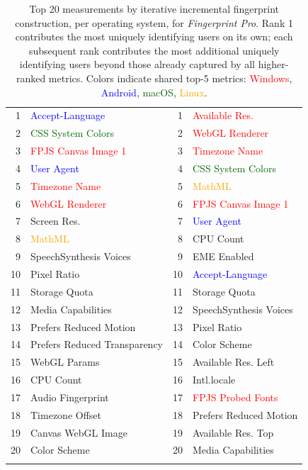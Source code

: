 \begin{table}[H]
\begin{tabular}{r l | r l}
\Xhline{2\arrayrulewidth}
1 & \textcolor{blue}{Accept-Language} & 1 & \textcolor{red}{Available Res.} \\
2 & \textcolor{darkgreen}{CSS System Colors} & 2 & \textcolor{red}{WebGL Renderer} \\
3 & \textcolor{red}{FPJS Canvas Image 1} & 3 & \textcolor{red}{Timezone Name} \\
4 & \textcolor{blue}{User Agent} & 4 & \textcolor{darkgreen}{CSS System Colors} \\
5 & \textcolor{red}{Timezone Name} & 5 & \textcolor{orange}{MathML} \\
6 & \textcolor{red}{WebGL Renderer} & 6 & \textcolor{red}{FPJS Canvas Image 1} \\
7 & Screen Res. & 7 & \textcolor{blue}{User Agent} \\
8 & \textcolor{orange}{MathML} & 8 & CPU Count \\
9 & SpeechSynthesis Voices & 9 & EME Enabled \\
10 & Pixel Ratio & 10 & \textcolor{blue}{Accept-Language} \\
11 & Storage Quota & 11 & Storage Quota \\
12 & Media Capabilities & 12 & SpeechSynthesis Voices \\
13 & Prefers Reduced Motion & 13 & Pixel Ratio \\
14 & Prefers Reduced Transparency & 14 & Color Scheme \\
15 & WebGL Params & 15 & Available Res. Left \\
16 & CPU Count & 16 & Intl.locale \\
17 & Audio Fingerprint & 17 & \textcolor{red}{FPJS Probed Fonts} \\
18 & Timezone Offset & 18 & Prefers Reduced Motion \\
19 & Canvas WebGL Image & 19 & Available Res. Top \\
20 & Color Scheme & 20 & Media Capabilities \\
\Xhline{2\arrayrulewidth}
\end{tabular}
\caption{Top 20 measurements by iterative incremental fingerprint construction, per operating system, for \textit{Fingerprint Pro}. Rank 1 contributes the most uniquely identifying users on its own; each subsequent rank contributes the most additional uniquely identifying users beyond those already captured by all higher-ranked metrics. Colors indicate shared top-5 metrics: \textcolor{red}{Windows}, \textcolor{blue}{Android}, \textcolor{darkgreen}{macOS}, \textcolor{orange}{Linux}.}
\label{tab:iterative_top20_by_os}
\end{table}
